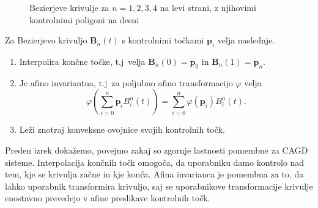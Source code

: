 \documentclass[isrm2, tisk]{fmfdelo}
\newcommand{\p}{\textbf{p}}
\newcommand{\lilb}[2]{B_{#1}^{#2}(t)}
\newcommand{\bigbbod}[2]{\textbf{B}_{#1}(#2)}
\newcommand{\bernsteinsump}[2]{\sum_{#1=0}^{#2} \p_{#1}\lilb{#1}{#2}}
\newcommand{\bernsteinsumtritri}[3]{\sum_{#1=0}^{#2} #3\lilb{#1}{#2}}
\begin{document}
\begin{figure}[ht!]
        \qquad
        \caption{Bezierjeve krivulje za $n=1,2,3,4$ na levi strani, z njihovimi kontrolnimi poligoni na desni}
        \label{fig:bezierjeva-krivulja}
    \end{figure}
    \begin{izrek}{Za Bezierjevo krivuljo $\mathbf{B}_n(t)$ s kontrolnimi točkami $\p_i$ velja naslednje.}
        \label{izrek:lastnosti-bezierjevih-krivulj}
        \begin{enumerate}
            \item Interpolira končne točke, t.j\ velja $\bigbbod{n}{0}=\p_0$ in $\bigbbod{n}{1}=\p_n$.
            \item Je afino invariantna, t.j\ za poljubno afino transformacijo $\varphi$ velja \[\varphi \left(\bernsteinsump{i}{n}\right) =\bernsteinsumtritri{i}{n}{\varphi(\p_i)}.\]
            \item Leži znotraj konveksne ovojnice svojih kontrolnih točk.
        \end{enumerate}
    \end{izrek}
    Preden izrek dokažemo, povejmo zakaj so zgornje lastnosti pomembne za CAGD sisteme.
    Interpolacija končnih točk omogoča, da uporabniku damo kontrolo nad tem, kje se krivulja začne in kje konča.
    Afina invarianca je pomembna za to, da lahko uporabnik transformira krivuljo, saj se uporabnikove transformacije krivulje enostavno prevedejo v afine preslikave kontrolnih točk.
\end{document}
